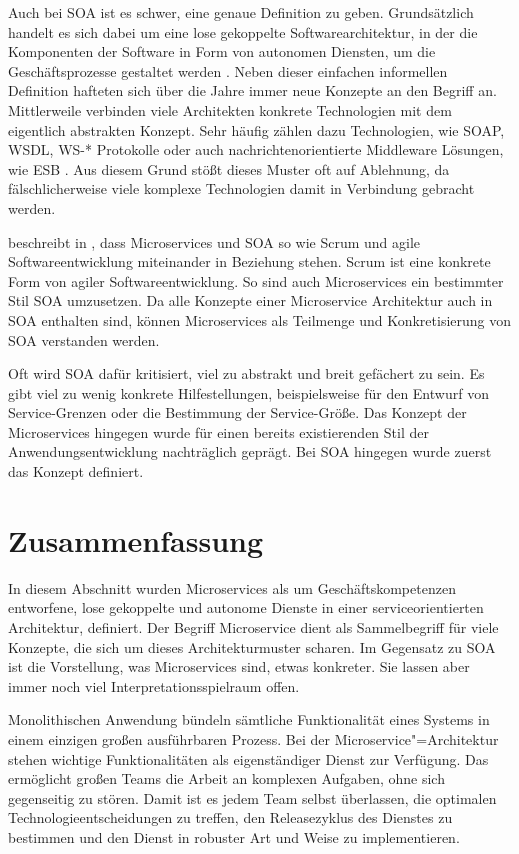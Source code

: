 Auch bei SOA ist es schwer, eine genaue Definition zu geben. Grundsätzlich handelt es sich dabei um eine lose gekoppelte Softwarearchitektur, in der die Komponenten der Software in Form von autonomen Diensten, um die Geschäftsprozesse gestaltet werden \cite{soaRW}. Neben dieser einfachen informellen Definition hafteten sich über die Jahre immer neue Konzepte an den Begriff an. Mittlerweile verbinden viele Architekten konkrete Technologien mit dem eigentlich abstrakten Konzept. Sehr häufig zählen dazu Technologien, wie SOAP, WSDL, WS-* Protokolle oder auch nachrichtenorientierte Middleware Lösungen, wie ESB \cite{fowlerGoTo}. Aus diesem Grund stößt dieses Muster oft auf Ablehnung, da fälschlicherweise viele komplexe Technologien damit in Verbindung gebracht werden.

\citeauthor{newman2015building} beschreibt in \cite[8]{newman2015building}, dass Microservices und SOA so wie Scrum und agile Softwareentwicklung miteinander in Beziehung stehen. Scrum ist eine konkrete Form von agiler Softwareentwicklung. So sind auch Microservices ein bestimmter Stil SOA umzusetzen. Da alle Konzepte einer Microservice Architektur auch in SOA enthalten sind, können Microservices als Teilmenge und Konkretisierung von SOA verstanden werden.

Oft wird SOA dafür kritisiert, viel zu abstrakt und breit gefächert zu sein. Es gibt viel zu wenig konkrete Hilfestellungen, beispielsweise für den Entwurf von Service-Grenzen oder die Bestimmung der Service-Größe. Das Konzept der Microservices hingegen wurde für einen bereits existierenden Stil der Anwendungsentwicklung nachträglich geprägt. Bei SOA hingegen wurde zuerst das Konzept definiert.

\section{Zusammenfassung}

In diesem Abschnitt wurden Microservices als um Geschäftskompetenzen entworfene, lose gekoppelte und autonome Dienste in einer serviceorientierten Architektur, definiert. Der Begriff Microservice dient als Sammelbegriff für viele Konzepte, die sich um dieses Architekturmuster scharen. Im Gegensatz zu SOA ist die Vorstellung, was Microservices sind, etwas konkreter. Sie lassen aber immer noch viel Interpretationsspielraum offen.

Monolithischen Anwendung bündeln sämtliche Funktionalität eines Systems in einem einzigen großen ausführbaren Prozess. Bei der Microservice"=Architektur stehen wichtige Funktionalitäten als eigenständiger Dienst zur Verfügung. Das ermöglicht großen Teams die Arbeit an komplexen Aufgaben, ohne sich gegenseitig zu stören. Damit ist es jedem Team selbst überlassen, die optimalen Technologieentscheidungen zu treffen, den Releasezyklus des Dienstes zu bestimmen und den Dienst in robuster Art und Weise zu implementieren.

